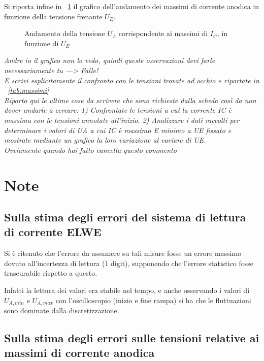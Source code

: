 \documentclass[10pt,a4paper]{article}
\begin{document}

Si riporta infine in \figurename{~\ref{fig:final}} il grafico dell'andamento dei massimi di corrente anodica in funzione della tensione frenante $U_E$.

\begin{figure}[h!]
	\centering
	\caption{Andamento della tensione $U_A$ corrispondente ai massimi di $I_C$, in funzione di $U_E$}
	\label{fig:final}
\end{figure}

\emph{\LARGE Andre io il grafico non lo vedo, quindi queste osservazioni devi farle necessariamente tu ---> Falle! \\	
E scrivi esplicitamente il confronto con le tensioni trovate ad occhio e riportate in \tablename{~\ref{tab:massimi}} \\
Riporto qui le ultime cose da scrivere che sono richieste dalla scheda così da non dover andarle a cercare:
1) Confrontate le tensioni a cui la corrente IC è massima con le tensioni annotate all'inizio.
2) Analizzare i dati raccolti per determinare i valori di UA a cui IC è massimo E minimo a UE fissato e mostrate mediante un grafico la loro variazione al variare di UE. \\
Ovviamente quando hai fatto cancella questo commento}

\section{Note}

\subsection{Sulla stima degli errori del sistema di lettura di corrente ELWE}
\label{errELWE}
Si è ritenuto che l'errore da assumere su tali misure fosse un errore massimo dovuto all'incertezza di lettura (1 digit), supponendo che l'errore statistico fosse trascurabile rispetto a questo.

Infatti la lettura dei valori era stabile nel tempo, e anche osservando i valori di $U_{A, min}$ e $U_{A, max}$ con l'oscilloscopio (inizio e fine rampa) si ha che le fluttuazioni sono dominate dalla discretizzazione.

\subsection{Sulla stima degli errori sulle tensioni relative ai massimi di corrente anodica}
\end{document}
